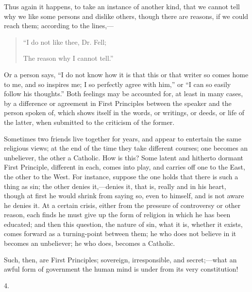 Thus again it happens, to take an instance of another
kind, that we cannot tell why we like some persons and
dislike others, though there are reasons, if we could
reach them; according to the lines,—

\begin{quote}

``I do not like thee, Dr. Fell;

The reason why I cannot tell.''

\end{quote}

Or a person says, ``I do not know how it is that
this or that writer so comes home to me, and so inspires
me; I so perfectly agree with him,'' or ``I can
so easily follow his thoughts.'' Both feelings may be
accounted for, at least in many cases, by a difference or
agreement in First Principles between the speaker and the
person spoken of, which shows itself in the words, or
writings, or deeds, or life of the latter, when submitted
to the criticism of the former.

Sometimes two friends live together for years, and
appear to entertain the same religious views; at the end
of the time they take different courses; one becomes an
unbeliever, the other a Catholic. How is this? Some
latent and hitherto dormant First Principle, different in
each, comes into play, and carries off one to the East,
the other to the West. For instance, suppose the one
holds that there is such a thing as sin; the other denies
it,—denies it, that is, really and in his heart,
though at first he would shrink from saying so, even to
himself, and is not aware he denies it. At a certain
crisis, either from the pressure of controversy or other
reason, each finds he must give up the form of religion
in which he has been educated; and then this question,
the nature of sin, what it is, whether it exists, comes
forward as a turning-point between them; he who does not
believe in it becomes an unbeliever; he who does, becomes
a Catholic.

Such, then, are First Principles; sovereign,
irresponsible, and secret;—what an awful form of
government the human mind is under from its very
constitution!

4.

